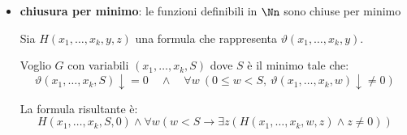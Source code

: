 \documentclass[a4paper,11pt]{report}
\begin{document}
\begin{proofframe}[title=per induzione]
\begin{itemize}
Si vede che questa formula è soddisfatta $\iff$ l'elemento appartiene al grafico della composta.
        
        \item \textbf{chiusura per minimo}: le funzioni definibili in \( \Nn \) sono chiuse per minimo

Sia \(H(x_1, \dots, x_k, y, z)\) una formula che rappresenta \(\vartheta(x_1, \dots, x_k, y)\).

Voglio \(G\) con variabili \((x_1, \dots, x_k, S)\) dove \(S\) è il minimo tale che:
\[
\vartheta(x_1, \dots, x_k, S) \downarrow = 0 \quad
\land \quad \forall w \ (0 \le w < S, \ \vartheta(x_1, \dots, x_k, w) \downarrow \neq 0)
\]

La formula risultante è:
\[
H(x_1, \dots, x_k, S, 0) \land \forall w (w < S \to \exists z (H(x_1, \dots, x_k, w, z) \land z \neq 0))
\]
    \end{itemize}
\end{proofframe}
\end{document}
